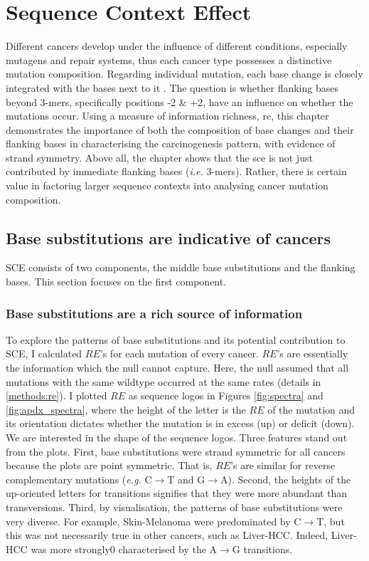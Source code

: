 \chapter{Sequence Context Effect}\label{sce}

Different cancers develop under the influence of different conditions, especially mutagens and repair systems, thus each cancer type possesses a distinctive mutation composition. Regarding individual mutation, each base change is closely integrated with the bases next to it \citep{Zhu2017,Zhu2020,Vinson2012CGMethylation}. The question is whether flanking bases beyond 3-mers, specifically positions -2 \& +2, have an influence on whether the mutations occur. Using a measure of information richness, \gls{re}, this chapter demonstrates the importance of both the composition of base changes and their flanking bases in characterising the carcinogenesis pattern, with evidence of strand symmetry. Above all, the chapter shows that the \gls{sce} is not just contributed by immediate flanking bases (\textit{i.e.} 3-mers). Rather, there is certain value in factoring larger sequence contexts into analysing cancer mutation composition.

\section{Base substitutions are indicative of cancers}
SCE consists of two components, the middle base substitutions and the flanking bases. This section focuses on the first component.

\subsection{Base substitutions are a rich source of information}
To explore the patterns of base substitutions and its potential contribution to SCE, I calculated $RE$'s for each mutation of every cancer. $RE$'s are essentially the information which the null cannot capture. Here, the null assumed that all mutations with the same wildtype occurred at the same rates (details in \ref{methods:re}). I plotted $RE$ as sequence logos in Figures \ref{fig:spectra} and \ref{fig:apdx_spectra}, where the height of the letter is the $RE$ of the mutation and its orientation dictates whether the mutation is in excess (up) or deficit (down). We are interested in the shape of the sequence logos. Three features stand out from the plots. First, base substitutions were strand symmetric for all cancers because the plots are point symmetric. That is, $RE$'s are similar for reverse complementary mutations (\textit{e.g.} C$\rightarrow$T and G$\rightarrow$A). Second, the heights of the up-oriented letters for transitions signifies that they were more abundant than transversions. Third, by visualisation, the patterns of base substitutions were very diverse. For example, Skin-Melanoma were predominated by C$\rightarrow$T, but this was not necessarily true in other cancers, such as Liver-HCC. Indeed, Liver-HCC was more strongly0 characterised by the A$\rightarrow$G transitions.

